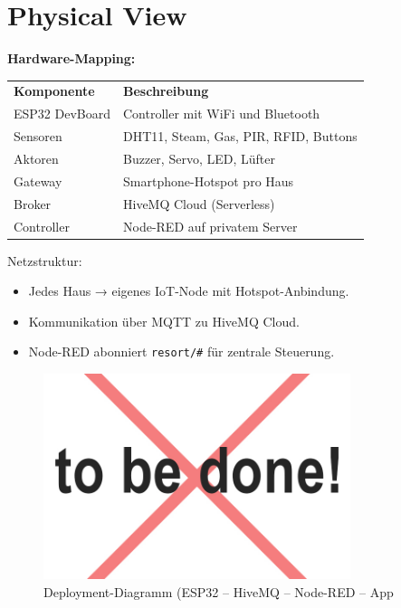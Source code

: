 \section{Physical View}
\textbf{Hardware-Mapping:}

\begin{tabular}{p{4cm}p{10cm}}
	\textbf{Komponente} & \textbf{Beschreibung} \\
	ESP32 DevBoard & Controller mit WiFi und Bluetooth \\
	Sensoren & DHT11, Steam, Gas, PIR, RFID, Buttons \\
	Aktoren & Buzzer, Servo, LED, Lüfter \\
	Gateway & Smartphone-Hotspot pro Haus \\
	Broker & HiveMQ Cloud (Serverless) \\
	Controller & Node-RED auf privatem Server \\
\end{tabular}

\vspace{1em}
Netzstruktur:
\begin{itemize}[noitemsep]
	\item Jedes Haus → eigenes IoT-Node mit Hotspot-Anbindung.
	\item Kommunikation über MQTT zu HiveMQ Cloud.
	\item Node-RED abonniert \texttt{resort/\#} für zentrale Steuerung.
\end{itemize}


\begin{figure}[h!]
	\centering
	\includegraphics[width=0.8\textwidth]{img/tbd.jpg}
	\caption{Deployment-Diagramm (ESP32 – HiveMQ – Node-RED – App}
	\label{fig:systemuebersicht}
\end{figure}

